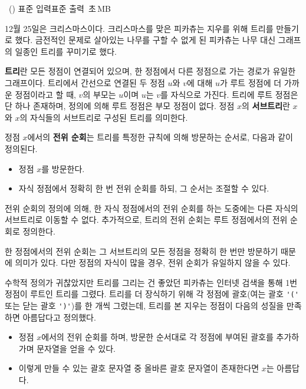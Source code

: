 \begin{problem}{\kcpcprobpretty\ (\kcpcprobprettyshort)}
    {표준 입력}{표준 출력}
    {\kcpcprobprettytime\,초}{\kcpcprobprettymemory\,MB}{}
    
    12월 25일은 크리스마스이다. 크리스마스를 맞은 피카츄는 지우를 위해 트리를 만들기로 했다. 금전적인 문제로 살아있는 나무를 구할 수 없게 된 피카츄는 나무 대신 그래프의 일종인 트리를 꾸미기로 했다.
    
    \textbf{트리}란 모든 정점이 연결되어 있으며, 한 정점에서 다른 정점으로 가는 경로가 유일한 그래프이다. 트리에서 간선으로 연결된 두 정점 $u$와 $v$에 대해 $u$가 루트 정점에 더 가까운 정점이라고 할 때, $v$의 부모는 $u$이며 $u$는 $v$를 자식으로 가진다. 트리에 루트 정점은 단 하나 존재하며, 정의에 의해 루트 정점은 부모 정점이 없다. 정점 $x$의 \textbf{서브트리}란 $x$와 $x$의 자식들의 서브트리로 구성된 트리를 의미한다.
    
    정점 $x$에서의 \textbf{전위 순회}는 트리를 특정한 규칙에 의해 방문하는 순서로, 다음과 같이 정의된다.
    
    \begin{itemize}
        \item 정점 $x$를 방문한다.
        \item 자식 정점에서 정확히 한 번 전위 순회를 하되, 그 순서는 조절할 수 있다.
    \end{itemize}
    전위 순회의 정의에 의해, 한 자식 정점에서의 전위 순회를 하는 도중에는 다른 자식의 서브트리로 이동할 수 없다. 추가적으로, 트리의 전위 순회는 루트 정점에서의 전위 순회로 정의한다.
    
    한 정점에서의 전위 순회는 그 서브트리의 모든 정점을 정확히 한 번만 방문하기 때문에 의미가 있다. 다만 정점의 자식이 많을 경우, 전위 순회가 유일하지 않을 수 있다.
    
    수학적 정의가 귀찮았지만 트리를 그리는 건 좋았던 피카츄는 인터넷 검색을 통해 1번 정점이 루트인 트리를 그렸다. 트리를 더 장식하기 위해 각 정점에 괄호(여는 괄호 \verb|'('| 또는 닫는 괄호 \verb|')'|)를 한 개씩 그렸는데, 트리를 본 지우는 정점이 다음의 성질을 만족하면 아름답다고 정의했다.
    
    \begin{itemize}
        \item 정점 $x$에서의 전위 순회를 하며, 방문한 순서대로 각 정점에 부여된 괄호를 추가하가며 문자열을 얻을 수 있다.
        \item 이렇게 만들 수 있는 괄호 문자열 중 올바른 괄호 문자열이 존재한다면 $ x $는 아름답다.    
    \end{itemize}
    

\end{problem}
